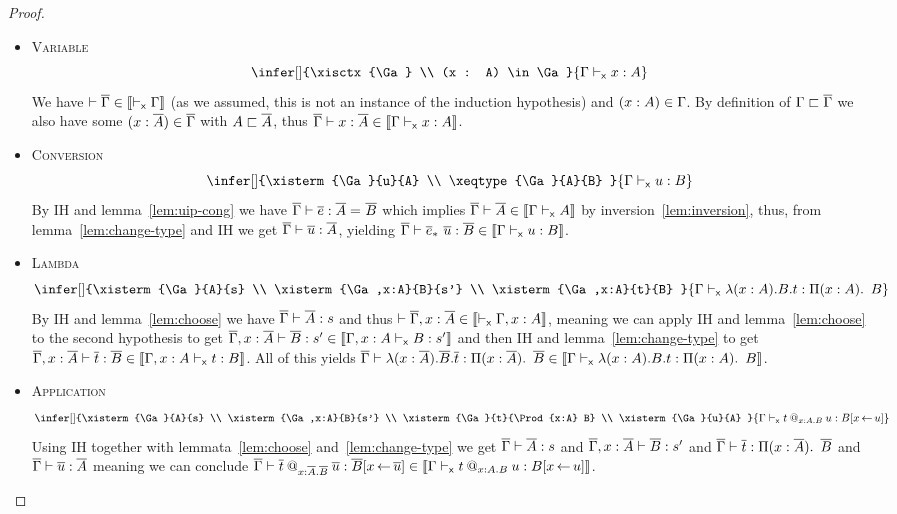\begin{proof}
\begin{itemize}
    \item \textsc{Variable}
    \[
      \infer[]
        {\xisctx{\Ga} \\
         (x : A) \in \Ga
        }
        {\xisterm{\Ga}{x}{A}}
    \]
    We have $\vdash \overline{\Gamma} \in \llbracket \vdash_{\mathsf{x}} \Gamma \rrbracket$ (as we assumed, this is not
    an instance of the induction hypothesis) and $(x : A) \in \Gamma$.
    By definition of $\Gamma \sqsubset \overline{\Gamma}$ we also have some $(x : \overline{A}) \in \overline{\Gamma}$
    with $A \sqsubset \overline{A}$, thus
    $\overline{\Gamma} \vdash x : \overline{A} \in \llbracket \Gamma \vdash_{\mathsf{x}} x : A \rrbracket$.

    \item \textsc{Conversion}
    \[
      \infer[]
        {\xisterm{\Ga}{u}{A} \\
         \xeqtype{\Ga}{A}{B}
        }
        {\xisterm{\Ga}{u}{B}}
    \]
    By IH and lemma~\ref{lem:uip-cong} we have
    $\overline{\Gamma} \vdash \overline{e} : \overline{A} =_{} \overline{B}$ which implies
    $\overline{\Gamma} \vdash \overline{A} \in \llbracket \Gamma \vdash_{\mathsf{x}} A \rrbracket$ by
    inversion~\eqref{lem:inversion}, thus, from lemma~\ref{lem:change-type}
    and IH we get $\overline{\Gamma} \vdash \overline{u} : \overline{A}$, yielding
    $\overline{\Gamma} \vdash \overline{e}_*\ \overline{u} : \overline{B} \in \llbracket \Gamma \vdash_{\mathsf{x}} u : B \rrbracket$.

    \item \textsc{Lambda}
    \[
      \infer[]
        {\xisterm{\Ga}{A}{s} \\
         \xisterm{\Ga,x:A}{B}{s'} \\
         \xisterm{\Ga,x:A}{t}{B}
        }
        {\xisterm{\Ga}{\lam{x:A}{B} t}{\Prod{x:A} B}}
    \]
    By IH and lemma~\ref{lem:choose} we have $\overline{\Gamma} \vdash \overline{A} : s$ and thus
    $\vdash \overline{\Gamma}, x:\overline{A} \in \llbracket \vdash_{\mathsf{x}} \Gamma,x:A \rrbracket$, meaning we can apply IH
    and lemma~\ref{lem:choose} to the second hypothesis to get
    $\overline{\Gamma},x:\overline{A} \vdash \overline{B} : s' \in \llbracket \Gamma,x:A \vdash_{\mathsf{x}} B : s' \rrbracket$ and then
    IH and lemma~\ref{lem:change-type} to get
    $\overline{\Gamma},x:\overline{A} \vdash \overline{t} : \overline{B} \in \llbracket \Gamma,x:A \vdash_{\mathsf{x}} t : B \rrbracket$.
    All of this yields
    $\overline{\Gamma} \vdash \lambda (x:\overline{A}). \overline{B} . \overline{t} : \mathop{\Pi(x:\overline{A}).\ } \overline{B}
    \in \llbracket \Gamma \vdash_{\mathsf{x}} \lambda (x:A). B . t : \mathop{\Pi(x:A).\ } B \rrbracket$.

    \item \textsc{Application}
    \[
      \infer[]
        {\xisterm{\Ga}{A}{s} \\
         \xisterm{\Ga,x:A}{B}{s'} \\
         \xisterm{\Ga}{t}{\Prod{x:A} B} \\
         \xisterm{\Ga}{u}{A}
        }
        {\xisterm{\Ga}{\app{t}{x:A}{B}{u}}{B[x \sto u]}}
    \]
    Using IH together with lemmata~\ref{lem:choose} and~\ref{lem:change-type}
    we get $\overline{\Gamma} \vdash \overline{A} : s$ and $\overline{\Gamma},x:\overline{A} \vdash \overline{B} : s'$ and
    $\overline{\Gamma} \vdash \overline{t} : \mathop{\Pi(x:\overline{A}).\ } \overline{B}$ and $\overline{\Gamma} \vdash \overline{u} : \overline{A}$
    meaning we can conclude
    $\overline{\Gamma} \vdash \overline{t}\mathbin{@_{x:\overline{A}.\overline{B}}} \overline{u} : \overline{B}[x \mathop{\leftarrow} \overline{u}]
    \in \llbracket \Gamma \vdash_{\mathsf{x}} t\mathbin{@_{x:A.B}} u : B[x \mathop{\leftarrow} u] \rrbracket$.


\end{itemize}
\end{proof}
